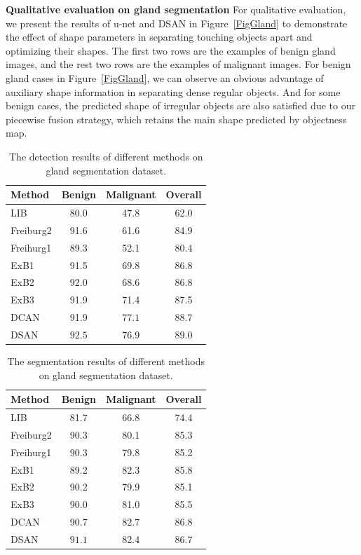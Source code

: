 \noindent\textbf{Qualitative evaluation on gland segmentation}
For qualitative evaluation, we present the results of u-net and DSAN in Figure~\ref{FigGland} to demonstrate the effect of shape parameters in separating touching objects apart and optimizing their shapes.
The first two rows are the examples of benign gland images, and the rest two rows are the examples of malignant images.
For benign gland cases in Figure~\ref{FigGland}, we can observe an obvious advantage of auxiliary shape information in separating dense regular objects.
And for some benign cases, the predicted shape of irregular objects are also satisfied due to our piecewise fusion strategy, which retains the main shape predicted by objectness map.

\begin{table}
\begin{center}
\begin{tabular}{l|ccc}
\hline
		Method &Benign & Malignant&Overall \\
		\hline
        LIB & 80.0&47.8&62.0\\
		Freiburg2 & 91.6 & 61.6&84.9 \\
        Freihurg1 &89.3&52.1&80.4\\		
        ExB1 & 91.5 & 69.8 &86.8\\
        ExB2 & 92.0 & 68.6 &86.8\\
        ExB3 & 91.9&71.4&87.5\\
		DCAN & 91.9 & $\mathbf{77.1}$& 88.7\\
		DSAN & $\mathbf{92.5}$ & 76.9&$\mathbf{89.0}$ \\
		\hline
\end{tabular}
\end{center}
\caption{The detection results of different methods on gland segmentation dataset.}
\label{tab:gland-det}
\end{table}

\begin{table}
\begin{center}
\begin{tabular}{l|ccc}
\hline
		Method &Benign & Malignant&Overall \\
		\hline
        LIB & 81.7&66.8&74.4\\
		Freiburg2 & 90.3 & 80.1&85.3 \\
        Freihurg1 &90.3&79.8&85.2\\	
        ExB1 & 89.2 & 82.3 & 85.8\\	
        ExB2 & 90.2 & 79.9 &85.1\\
        ExB3 & 90.0&81.0&85.5\\
		DCAN & 90.7&$\mathbf{82.7}$&$\mathbf{86.8}$ \\
		DSAN & $\mathbf{91.1}$& 82.4& 86.7 \\
		\hline
\end{tabular}
\end{center}
\caption{The  segmentation results of different methods on gland segmentation dataset.}
\label{tab:gland-seg}
\end{table}

